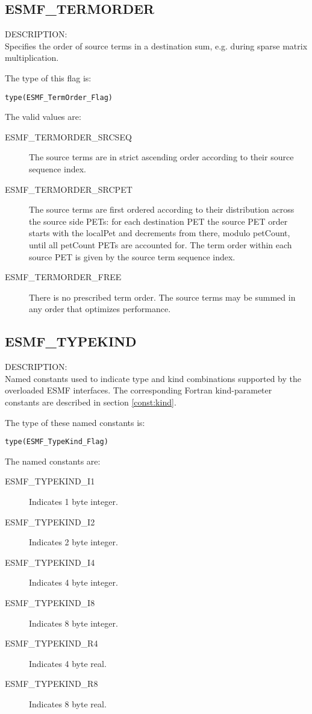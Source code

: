 \subsection{ESMF\_TERMORDER}
\label{const:termorderflag}
{\sf DESCRIPTION:\\}  
Specifies the order of source terms in a destination sum, e.g. during sparse
matrix multiplication.

The type of this flag is:

{\tt type(ESMF\_TermOrder\_Flag)}

The valid values are:
\begin{description}

\item [ESMF\_TERMORDER\_SRCSEQ]
         The source terms are in strict ascending order according to
         their source sequence index.
\item [ESMF\_TERMORDER\_SRCPET]
         The source terms are first ordered according to their distribution
         across the source side PETs: for each destination PET the source PET
         order starts with the localPet and decrements from there, modulo
         petCount, until all petCount PETs are accounted for. The term order
         within each source PET is given by the source term sequence index.
\item [ESMF\_TERMORDER\_FREE]
         There is no prescribed term order. The source terms may be summed in 
         any order that optimizes performance.
\end{description}


\subsection{ESMF\_TYPEKIND}
\label{const:typekind}

{\sf DESCRIPTION:\\}
Named constants used to indicate type and kind combinations supported by the
overloaded ESMF interfaces. The corresponding Fortran kind-parameter constants
are described in section \ref{const:kind}.

The type of these named constants is:

{\tt type(ESMF\_TypeKind\_Flag)}

The named constants are:
\begin{description}
\item [ESMF\_TYPEKIND\_I1]
      Indicates 1 byte integer.
\item [ESMF\_TYPEKIND\_I2]
      Indicates 2 byte integer.
\item [ESMF\_TYPEKIND\_I4]
      Indicates 4 byte integer.
\item [ESMF\_TYPEKIND\_I8]
      Indicates 8 byte integer.
\item [ESMF\_TYPEKIND\_R4]
      Indicates 4 byte real.
\item [ESMF\_TYPEKIND\_R8]
      Indicates 8 byte real.
\end{description}

